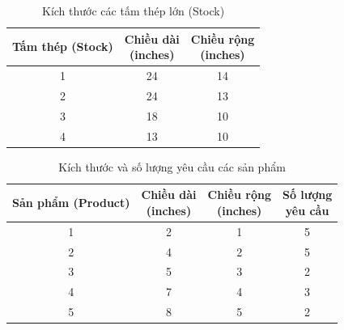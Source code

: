 \documentclass[a4paper]{article}
\begin{document}
\begin{table}[h!]
    \centering
    \begin{tabular}{|c|c|c|}
    \hline
    \textbf{Tấm thép (Stock)} & \makecell{\textbf{Chiều dài} \\ \textbf{(inches)}} & \makecell{\textbf{Chiều rộng} \\ \textbf{(inches)}} \\ \hline
    1                         & 24                        & 14                        \\ \hline
    2                         & 24                        & 13                        \\ \hline
    3                         & 18                        & 10                        \\ \hline
    4                         & 13                        & 10                        \\ \hline
    \end{tabular}
    \caption{Kích thước các tấm thép lớn (Stock)}
    \label{table:stock_sizes}
\end{table}

\begin{table}[h!]
    \centering
    \begin{tabular}{|c|c|c|c|}
    \hline
    \textbf{Sản phẩm (Product)} & \makecell{\textbf{Chiều dài} \\ \textbf{(inches)}} & \makecell{\textbf{Chiều rộng} \\ \textbf{(inches)}} & \makecell{\textbf{Số lượng} \\ \textbf{yêu cầu}} \\ \hline
    1                           & 2                          & 1                           & 5                         \\ \hline
    2                           & 4                          & 2                           & 5                         \\ \hline
    3                           & 5                          & 3                           & 2                         \\ \hline
    4                           & 7                          & 4                           & 3                         \\ \hline
    5                           & 8                          & 5                           & 2                         \\ \hline
    \end{tabular}
    \caption{Kích thước và số lượng yêu cầu các sản phẩm}
    \label{table:demand_sizes}
\end{table}
\end{document}
